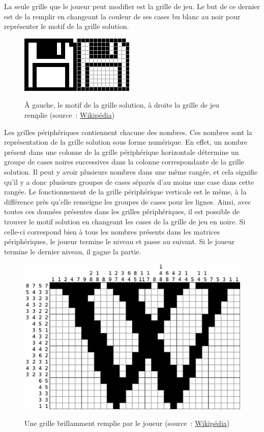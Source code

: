 \documentclass[a4paper,11pt]{article}
\begin{document}
La seule grille que le joueur peut modifier est la grille de jeu. Le but de ce dernier est de la remplir en changeant la couleur de ses cases bu blanc au noir pour représenter le motif de la grille solution.
\begin{figure}[!h]
	\centering
	\caption[Comparaison solution et grille de jeu]{À gauche, le motif de la grille solution, à droite la grille de jeu remplie (source~: \href{https://commons.wikimedia.org/wiki/File:Picross_DS_Mini-Game.png}{Wikipédia})}\medbreak
	\includegraphics{PicrossDSMini-Game.png}
	\label{figure:comparaison_grilles}
\end{figure}\bigbreak
Les grilles périphériques contiennent chacune des nombres. Ces nombres sont la représentation de la grille solution sous forme numérique. En effet, un nombre présent dans une colonne de la grille périphérique horizontale détermine un groupe de cases noires successives dans la colonne correspondante de la grille solution. Il peut y avoir plusieurs nombres dans une même rangée, et cela signifie qu’il y a donc plusieurs groupes de cases séparés d’au moins une case dans cette rangée. Le fonctionnement de la grille périphérique verticale est le même, à la différence près qu'elle renseigne les groupes de cases pour les lignes. Ainsi, avec toutes ces données présentes dans les grilles périphériques, il est possible de trouver le motif solution en changeant les cases de la grille de jeu en noire. Si celle-ci correspond bien à tous les nombres présents dans les matrices périphériques, le joueur termine le niveau et passe au suivant. Si le joueur termine le dernier niveau, il gagne la partie.
\begin{figure}[!h]
	\centering
	\caption[Grille complétée correctement]{Une grille brillamment remplie par le joueur (source~: \href{https://en.wikipedia.org/wiki/Nonogram}{Wikipédia})}\medbreak
	\includegraphics[scale=0.15]{Nonogram.png}
	\label{figure:nonogram}
\end{figure}
\newpage
\end{document}
